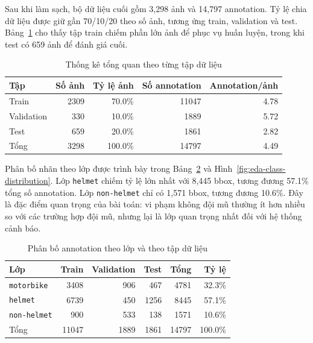 Sau khi làm sạch, bộ dữ liệu cuối gồm 3,298 ảnh và 14,797 annotation. Tỷ lệ chia dữ liệu được giữ gần 70/10/20 theo số ảnh, tương ứng train, validation và test. Bảng~\ref{tab:data-split-eda} cho thấy tập train chiếm phần lớn ảnh để phục vụ huấn luyện, trong khi test có 659 ảnh để đánh giá cuối.

\begin{table}[H]
    \centering
    \small
    \caption{Thống kê tổng quan theo từng tập dữ liệu}
    \label{tab:data-split-eda}
    \begin{tabular}{lrrrr}
        \toprule
        \textbf{Tập} & \textbf{Số ảnh} & \textbf{Tỷ lệ ảnh} & \textbf{Số annotation} & \textbf{Annotation/ảnh} \\
        \midrule
        Train & 2309 & 70.0\% & 11047 & 4.78 \\
        Validation & 330 & 10.0\% & 1889 & 5.72 \\
        Test & 659 & 20.0\% & 1861 & 2.82 \\
        \midrule
        Tổng & 3298 & 100.0\% & 14797 & 4.49 \\
        \bottomrule
    \end{tabular}
\end{table}

Phân bố nhãn theo lớp được trình bày trong Bảng~\ref{tab:class-distribution-eda} và Hình~\ref{fig:eda-class-distribution}. Lớp \texttt{helmet} chiếm tỷ lệ lớn nhất với 8,445 bbox, tương đương 57.1\% tổng số annotation. Lớp \texttt{non-helmet} chỉ có 1,571 bbox, tương đương 10.6\%. Đây là đặc điểm quan trọng của bài toán: vi phạm không đội mũ thường ít hơn nhiều so với các trường hợp đội mũ, nhưng lại là lớp quan trọng nhất đối với hệ thống cảnh báo.

\begin{table}[H]
    \centering
    \small
    \caption{Phân bố annotation theo lớp và theo tập dữ liệu}
    \label{tab:class-distribution-eda}
    \begin{tabular}{lrrrrr}
        \toprule
        \textbf{Lớp} & \textbf{Train} & \textbf{Validation} & \textbf{Test} & \textbf{Tổng} & \textbf{Tỷ lệ} \\
        \midrule
        \texttt{motorbike} & 3408 & 906 & 467 & 4781 & 32.3\% \\
        \texttt{helmet} & 6739 & 450 & 1256 & 8445 & 57.1\% \\
        \texttt{non-helmet} & 900 & 533 & 138 & 1571 & 10.6\% \\
        \midrule
        Tổng & 11047 & 1889 & 1861 & 14797 & 100.0\% \\
        \bottomrule
    \end{tabular}
\end{table}

